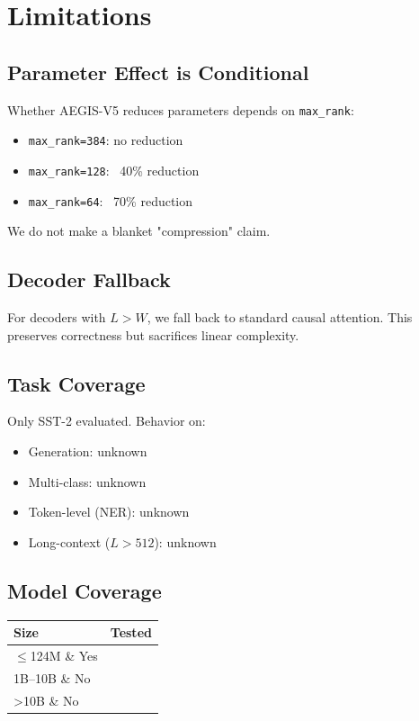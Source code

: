 \section{Limitations}

\subsection{Parameter Effect is Conditional}

Whether AEGIS-V5 reduces parameters depends on \texttt{max\_rank}:

\begin{itemize}
\item \texttt{max\_rank=384}: no reduction
\item \texttt{max\_rank=128}: ~40\% reduction
\item \texttt{max\_rank=64}: ~70\% reduction

\end{itemize}
We do not make a blanket "compression" claim.

\subsection{Decoder Fallback}

For decoders with $L > W$, we fall back to standard causal attention. This 
preserves correctness but sacrifices linear complexity.

\subsection{Task Coverage}

Only SST-2 evaluated. Behavior on:
\begin{itemize}
\item Generation: unknown
\item Multi-class: unknown
\item Token-level (NER): unknown
\item Long-context ($L > 512$): unknown

\end{itemize}
\subsection{Model Coverage}

\begin{table}[H]
\centering
\small
\begin{tabular}{ll}
\toprule
\textbf{Size} & \textbf{Tested} \\
\midrule
$\le$124M \& Yes \\
1B--10B \& No \\
>10B \& No \\
\bottomrule
\end{tabular}
\end{table}

